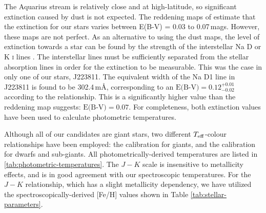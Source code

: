 \documentclass{emulateapj}
\begin{document}
The Aquarius stream is relatively close and at high-latitude, so significant extinction caused by dust is not expected. The reddening maps of \citet{schlegel;et-al_1998} estimate that the extinction for our stars varies between E(B-V) = 0.03 to 0.07\,mags. However, these maps are not perfect. As an alternative to using the \citet{schlegel;et-al_1998} dust maps, the level of extinction towards a star can be found by the strength of the interstellar Na D or K \textsc{i} lines \citep{munari;zwitter_1997}. The interstellar lines must be sufficiently separated from the stellar absorption lines in order for the extinction to be measurable. This was the case in only one of our stars, J223811. The equivalent width of the Na D1 line in J223811 is found to be 302.4\,m{\AA}, corresponding to an $\mbox{E(B-V)} = 0.12^{+0.01}_{-0.02}$ according to the \citet{munari;zwitter_1997} relationship. This is a significantly higher value than the \citet{schlegel;et-al_1998} reddening map suggests: $\mbox{E(B-V)} = 0.07$. For completeness, both extinction values have been used to calculate photometric temperatures. 

Although all of our candidates are giant stars, two different $T_{\rm eff}$-colour relationships have been employed: the \citet{alonso;et-al_1999} calibration for giants, and the \citet{casagrande;et-al_2010} calibration for dwarfs and sub-giants. All photometrically-derived temperatures are listed in \ref{tab:photometric-temperatures}. The \citet{alonso;et-al_1999} $J-K$ scale is insensitive to metallicity effects, and is in good agreement with our spectroscopic temperatures. For the \citet{casagrande;et-al_2010} $J-K$ relationship, which has a slight metallicity dependency, we have utilized the spectroscopically-derived [Fe/H] values shown in Table \ref{tab:stellar-parameters}.
\end{document}
